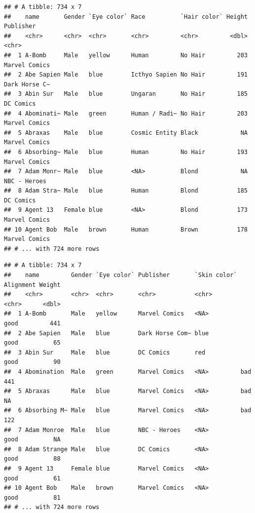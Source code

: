 \documentclass[
]{book}
\newenvironment{Shaded}{\begin{snugshade}}{\end{snugshade}}
\newcommand{\DataTypeTok}[1]{\textcolor[rgb]{0.13,0.29,0.53}{#1}}
\newcommand{\KeywordTok}[1]{\textcolor[rgb]{0.13,0.29,0.53}{\textbf{#1}}}
\newcommand{\NormalTok}[1]{#1}
\newcommand{\OperatorTok}[1]{\textcolor[rgb]{0.81,0.36,0.00}{\textbf{#1}}}
\newcommand{\StringTok}[1]{\textcolor[rgb]{0.31,0.60,0.02}{#1}}
\begin{document}
\begin{verbatim}
## # A tibble: 734 x 7
##    name       Gender `Eye color` Race          `Hair color` Height Publisher    
##    <chr>      <chr>  <chr>       <chr>         <chr>         <dbl> <chr>        
##  1 A-Bomb     Male   yellow      Human         No Hair         203 Marvel Comics
##  2 Abe Sapien Male   blue        Icthyo Sapien No Hair         191 Dark Horse C~
##  3 Abin Sur   Male   blue        Ungaran       No Hair         185 DC Comics    
##  4 Abominati~ Male   green       Human / Radi~ No Hair         203 Marvel Comics
##  5 Abraxas    Male   blue        Cosmic Entity Black            NA Marvel Comics
##  6 Absorbing~ Male   blue        Human         No Hair         193 Marvel Comics
##  7 Adam Monr~ Male   blue        <NA>          Blond            NA NBC - Heroes 
##  8 Adam Stra~ Male   blue        Human         Blond           185 DC Comics    
##  9 Agent 13   Female blue        <NA>          Blond           173 Marvel Comics
## 10 Agent Bob  Male   brown       Human         Brown           178 Marvel Comics
## # ... with 724 more rows
\end{verbatim}

\begin{Shaded}
\end{Shaded}

\begin{verbatim}
## # A tibble: 734 x 7
##    name         Gender `Eye color` Publisher       `Skin color` Alignment Weight
##    <chr>        <chr>  <chr>       <chr>           <chr>        <chr>      <dbl>
##  1 A-Bomb       Male   yellow      Marvel Comics   <NA>         good         441
##  2 Abe Sapien   Male   blue        Dark Horse Com~ blue         good          65
##  3 Abin Sur     Male   blue        DC Comics       red          good          90
##  4 Abomination  Male   green       Marvel Comics   <NA>         bad          441
##  5 Abraxas      Male   blue        Marvel Comics   <NA>         bad           NA
##  6 Absorbing M~ Male   blue        Marvel Comics   <NA>         bad          122
##  7 Adam Monroe  Male   blue        NBC - Heroes    <NA>         good          NA
##  8 Adam Strange Male   blue        DC Comics       <NA>         good          88
##  9 Agent 13     Female blue        Marvel Comics   <NA>         good          61
## 10 Agent Bob    Male   brown       Marvel Comics   <NA>         good          81
## # ... with 724 more rows
\end{verbatim}
\end{document}
